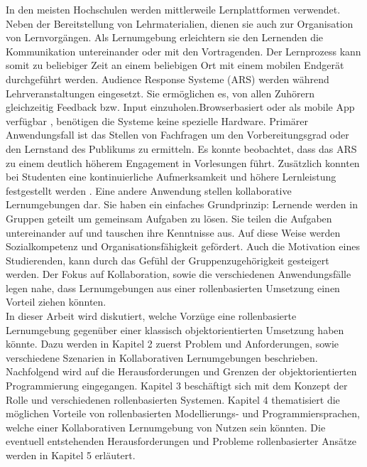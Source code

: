 \documentclass[conference]{IEEEtran}
\begin{document}
In den meisten Hochschulen werden mittlerweile Lernplattformen verwendet. Neben der Bereitstellung von Lehrmaterialien, dienen sie auch zur Organisation von Lernvorgängen. Als Lernumgebung erleichtern sie den Lernenden die Kommunikation untereinander oder mit den Vortragenden. Der Lernprozess kann somit zu beliebiger Zeit an einem beliebigen Ort mit einem mobilen Endgerät durchgeführt werden. Audience Response Systeme (ARS) werden während Lehrveranstaltungen eingesetzt. Sie ermöglichen es, von allen Zuhörern gleichzeitig Feedback bzw. Input einzuholen.Browserbasiert oder als mobile App verfügbar , benötigen die Systeme keine spezielle Hardware. Primärer Anwendungsfall ist das Stellen von Fachfragen um den Vorbereitungsgrad oder den Lernstand des Publikums zu ermitteln. Es konnte beobachtet, dass das ARS zu einem deutlich höherem Engagement in Vorlesungen führt. Zusätzlich konnten bei Studenten eine kontinuierliche Aufmerksamkeit und höhere Lernleistung festgestellt werden \cite{digitaleHochschule}. Eine andere Anwendung stellen kollaborative Lernumgebungen dar. Sie haben ein einfaches Grundprinzip: Lernende werden in Gruppen geteilt um gemeinsam Aufgaben zu lösen. Sie teilen die Aufgaben untereinander auf und tauschen ihre Kenntnisse aus. Auf diese Weise werden Sozialkompetenz und Organisationsfähigkeit gefördert. Auch die Motivation eines Studierenden, kann durch das Gefühl der Gruppenzugehörigkeit gesteigert werden. Der Fokus auf Kollaboration, sowie die verschiedenen Anwendungsfälle legen nahe, dass Lernumgebungen aus einer rollenbasierten Umsetzung einen Vorteil ziehen könnten. \\ In dieser Arbeit wird diskutiert, welche Vorzüge eine rollenbasierte Lernumgebung gegenüber einer klassisch objektorientierten Umsetzung haben könnte. Dazu werden in Kapitel 2 zuerst Problem und Anforderungen, sowie verschiedene Szenarien in Kollaborativen Lernumgebungen beschrieben. Nachfolgend wird auf die Herausforderungen und Grenzen der objektorientierten Programmierung eingegangen. Kapitel 3 beschäftigt sich mit dem Konzept der Rolle und verschiedenen rollenbasierten Systemen. Kapitel 4 thematisiert die möglichen Vorteile von rollenbasierten Modellierungs- und Programmiersprachen, welche einer Kollaborativen Lernumgebung von Nutzen sein könnten. Die eventuell entstehenden Herausforderungen und Probleme rollenbasierter Ansätze werden in Kapitel 5 erläutert.
\end{document}
